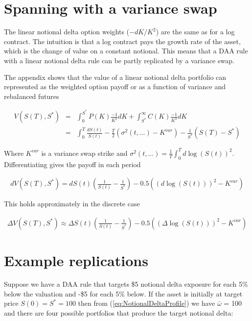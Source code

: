 \documentclass[12pt]{article}
\begin{document}
\section{Spanning with a variance swap}

The linear notional delta option weights ($-dK/K^2$) are the same as for a log contract. The intuition is that a log contract pays the growth rate of the asset, which is the change of value on a constant notional. This means that a DAA rule with a linear notional delta rule can be partly replicated by a variance swap.

The appendix shows that the value of a linear notional delta portfolio can represented as the weighted option payoff or as a function of variance and rebalanced futures

\begin{eqnarray*}
V(S(T), S^*) &=& \int_0^{S^*} P(K) \frac{-1}{K^2}dK + \int_{S^*}^\infty C(K) \frac{-1}{K^2}dK\\
             &=& \int_0^T \frac{dS(t)}{S(t)} -\frac{T}{2}(\sigma^2(t,...) - K^{var})  - \frac{1}{S^*}(S(T)-S^*)
\end{eqnarray*}

Where $K^{var}$ is a variance swap strike and $\sigma^2(t,...) = \frac{1}{T}\int_0^T d \log(S(t))^2$. Differentiating gives the payoff in each period

\begin{eqnarray} \label{varianceReplication}
dV(S(T), S^*) = dS(t)\left(\frac{1}{S(t)} - \frac{1}{S^*}\right)  - 0.5( (d \log(S(t)))^2-K^{var}) 
\end{eqnarray}

This holds approximately in the discrete case

\begin{eqnarray*}
\Delta V(S(T), S^*) \approx \Delta S(t)\left(\frac{1}{S(t)} - \frac{1}{S^*}\right)  - 0.5( (\Delta \log(S(t)))^2-K^{var}) 
\end{eqnarray*}


\section{Example replications}

Suppose we have a DAA rule that targets \$5 notional delta exposure for each 5\% below the valuation and -\$5 for each 5\% below. If the asset is initially at target price $S(0)=S^*=100$ then from (\ref{eq:NotionalDeltaProfile}) we have $\bar{\omega}$ = 100 and there are four possible portfolios that produce the target notional delta:
\end{document}
